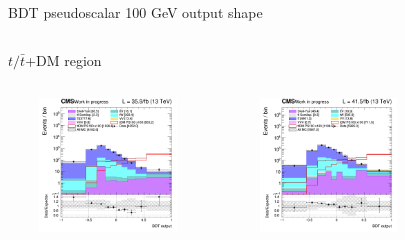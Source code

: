\documentclass[8pt]{beamer}
\begin{document}
\begin{frame}{BDT pseudoscalar 100 GeV output shape}
\begin{columns}
\begin{column}{1.09\textwidth}
\begin{block}{\centering $t/\bar t$+DM region}\end{block} \vspace{10pt}
\end{column}
\end{columns} \vspace{-24pt}
\begin{columns}
		\begin{column}{0.33\textwidth}
			\begin{center}
			\begin{block}{}\end{block}	
     			\includegraphics[width=1.0\textwidth, height=100pt]{figs/2016/SmearSR-ttDM-pseudo100/log_cratio_ST_topCR_ll_BDT_ttDM100_ST_BDT_output_pseudoscalar100_customBinsAttempt7.png}
    		\end{center}		
		\end{column} 
		\begin{column}{0.33\textwidth}
			\begin{center}
			\begin{block}{}\end{block}	
     			\includegraphics[width=1.0\textwidth, height=100pt]{figs/2017/SmearSR-ttDM-pseudo100/log_cratio_ST_topCR_ll_BDT_ttDM100_ST_BDT_output_pseudoscalar100_customBinsAttempt7.png}
    		\end{center}		
		\end{column} 
		\begin{column}{0.33\textwidth}
			\begin{center}

\end{center}
\end{column}
\end{columns}
\end{frame}
\end{document}
